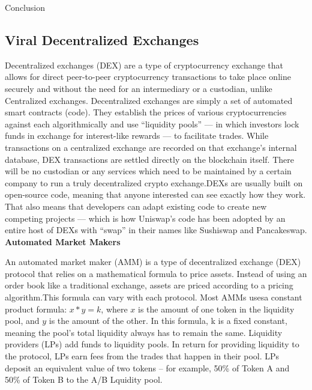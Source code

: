 \documentclass[10pt]{article}
\begin{document}
Conclusion\\

\subsection{Viral Decentralized Exchanges}

Decentralized exchanges (DEX) are a type of cryptocurrency exchange that allows for direct peer-to-peer cryptocurrency transactions to take place online securely and without the need for an intermediary or a custodian, unlike Centralized exchanges. Decentralized exchanges are simply a set of automated smart contracts (code). They establish the prices of various cryptocurrencies against each algorithmically and use “liquidity pools” — in which investors lock funds in exchange for interest-like rewards — to facilitate trades. While transactions on a centralized exchange are recorded on that exchange’s internal database, DEX transactions are settled directly on the blockchain itself. There will be no custodian or any services which need to be maintained by a certain company to run a truly decentralized crypto exchange.DEXs are usually built on open-source code, meaning that anyone interested can see exactly how they work. That also means that developers can adapt existing code to create new competing projects — which is how Uniswap’s code has been adopted by an entire host of DEXs with “swap” in their names like Sushiswap and Pancakeswap.\\

\textbf{Automated Market Makers}

An automated market maker (AMM) is a type of decentralized exchange (DEX) protocol that relies on a mathematical formula to price assets. Instead of using an order book like a traditional exchange, assets are priced according to a pricing algorithm.This formula can vary with each protocol. Most AMMs usesa constant product formula: $x * y = k$, where $x$ is the amount of one token in the liquidity pool, and $y$ is the amount of the other. In this formula, k is a fixed constant, meaning the pool’s total liquidity always has to remain the same. Liquidity providers (LPs) add funds to liquidity pools. In return for providing liquidity to the protocol, LPs earn fees from the trades that happen in their pool. LPs deposit an equivalent value of two tokens – for example, 50\% of Token A and 50\% of Token B to the A/B Lquidity pool.\\
\end{document}
